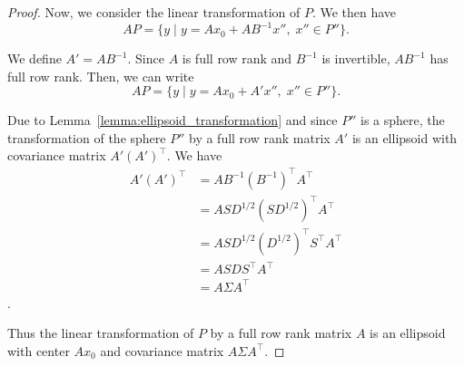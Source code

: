 \documentclass{article}
\begin{document}
\begin{proof}
	Now, we consider the linear transformation of \(P\).
	We then have 
	\[
	A P = \{y \;\vert\; y = A x_0 + A B^{-1}x'',\; x'' \in P''\}.	
	\]

	We define \(A' = A B^{-1}\). Since \(A\) is full row rank and \(B^{-1}\) is invertible, \(A B^{-1}\) has full row rank.
	Then, we can write
	\[
	A P = \{y \;\vert\; y = A x_0 + A' x'',\; x'' \in P''\}.	
	\]

	Due to Lemma~\ref{lemma:ellipsoid_transformation} and since \(P''\) is a sphere, the transformation of the sphere \(P''\) by a full row rank matrix \(A'\) is an ellipsoid with covariance matrix \(A' (A')^{\top}\).
	We have 
	\begin{align*}
		A' (A')^{\top} &= A B^{-1} (B^{-1})^{\top}A^{\top}\\
		&= A S D^{1/2} (S D^{1/2})^{\top}A^{\top}\\
		&= A S D^{1/2}  (D^{1/2})^{\top}S^{\top} A^{\top}\\
		&= A S D S^{\top} A^{\top}\\
		&= A \Sigma A^{\top}
	\end{align*}.

	Thus the linear transformation of \(P\) by a full row rank matrix \(A\) is an ellipsoid with center \(A x_0\) and covariance matrix \(A \Sigma A^{\top}\).
\end{proof}
\end{document}
